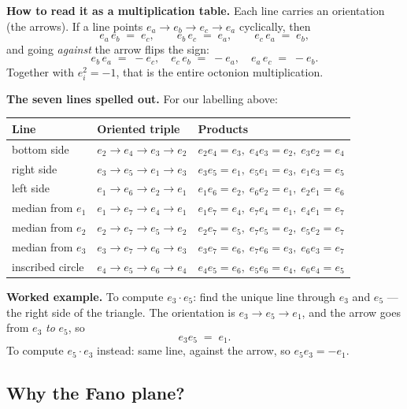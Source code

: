 \documentclass[11pt]{article}
\begin{document}
\textbf{How to read it as a multiplication table.} Each line carries
an orientation (the arrows). If a line points
$e_a \to e_b \to e_c \to e_a$ cyclically, then
\[
  e_a\, e_b \;=\; e_c, \qquad
  e_b\, e_c \;=\; e_a, \qquad
  e_c\, e_a \;=\; e_b ,
\]
and going \emph{against} the arrow flips the sign:
\[
  e_b\, e_a \;=\; -e_c, \quad
  e_c\, e_b \;=\; -e_a, \quad
  e_a\, e_c \;=\; -e_b .
\]
Together with $e_i^2 = -1$, that is the entire octonion multiplication.

\textbf{The seven lines spelled out.} For our labelling above:

\begin{center}
\begin{tabular}{l l l}
\textbf{Line} & \textbf{Oriented triple} & \textbf{Products} \\
\hline
bottom side       & $e_2 \to e_4 \to e_3 \to e_2$ & $e_2 e_4 = e_3,\; e_4 e_3 = e_2,\; e_3 e_2 = e_4$ \\
right side        & $e_3 \to e_5 \to e_1 \to e_3$ & $e_3 e_5 = e_1,\; e_5 e_1 = e_3,\; e_1 e_3 = e_5$ \\
left side         & $e_1 \to e_6 \to e_2 \to e_1$ & $e_1 e_6 = e_2,\; e_6 e_2 = e_1,\; e_2 e_1 = e_6$ \\
median from $e_1$ & $e_1 \to e_7 \to e_4 \to e_1$ & $e_1 e_7 = e_4,\; e_7 e_4 = e_1,\; e_4 e_1 = e_7$ \\
median from $e_2$ & $e_2 \to e_7 \to e_5 \to e_2$ & $e_2 e_7 = e_5,\; e_7 e_5 = e_2,\; e_5 e_2 = e_7$ \\
median from $e_3$ & $e_3 \to e_7 \to e_6 \to e_3$ & $e_3 e_7 = e_6,\; e_7 e_6 = e_3,\; e_6 e_3 = e_7$ \\
inscribed circle  & $e_4 \to e_5 \to e_6 \to e_4$ & $e_4 e_5 = e_6,\; e_5 e_6 = e_4,\; e_6 e_4 = e_5$ \\
\end{tabular}
\end{center}

\textbf{Worked example.} To compute $e_3 \cdot e_5$: find the unique
line through $e_3$ and $e_5$ --- the right side of the triangle.
The orientation is $e_3 \to e_5 \to e_1$, and the arrow goes from
$e_3$ \emph{to} $e_5$, so
\[
  e_3 e_5 \;=\; e_1 .
\]
To compute $e_5 \cdot e_3$ instead: same line, against the arrow, so
$e_5 e_3 = -e_1$.

\subsection*{Why the Fano plane?}
\end{document}

